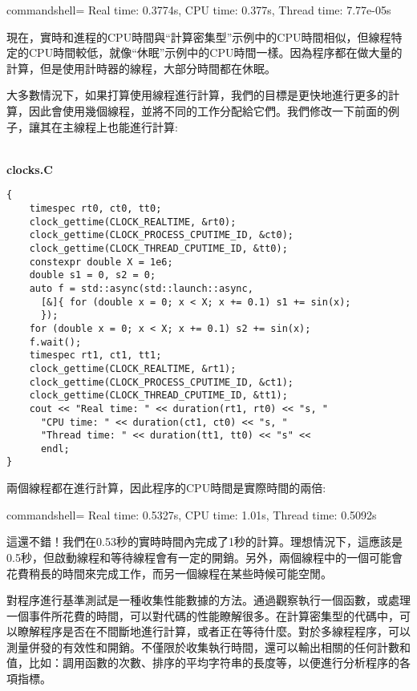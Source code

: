 \begin{tcblisting}{commandshell={}}
Real time: 0.3774s, CPU time: 0.377s, Thread time: 7.77e-05s
\end{tcblisting}

現在，實時和進程的CPU時間與“計算密集型”示例中的CPU時間相似，但線程特定的CPU時間較低，就像“休眠”示例中的CPU時間一樣。因為程序都在做大量的計算，但是使用計時器的線程，大部分時間都在休眠。

大多數情況下，如果打算使用線程進行計算，我們的目標是更快地進行更多的計算，因此會使用幾個線程，並將不同的工作分配給它們。我們修改一下前面的例子，讓其在主線程上也能進行計算:

\hspace*{\fill} \\ %
\noindent
\textbf{clocks.C}
\begin{lstlisting}[style=styleCXX]
{
	timespec rt0, ct0, tt0;
	clock_gettime(CLOCK_REALTIME, &rt0);
	clock_gettime(CLOCK_PROCESS_CPUTIME_ID, &ct0);
	clock_gettime(CLOCK_THREAD_CPUTIME_ID, &tt0);
	constexpr double X = 1e6;
	double s1 = 0, s2 = 0;
	auto f = std::async(std::launch::async,
	  [&]{ for (double x = 0; x < X; x += 0.1) s1 += sin(x);
	  });
	for (double x = 0; x < X; x += 0.1) s2 += sin(x);
	f.wait();
	timespec rt1, ct1, tt1;
	clock_gettime(CLOCK_REALTIME, &rt1);
	clock_gettime(CLOCK_PROCESS_CPUTIME_ID, &ct1);
	clock_gettime(CLOCK_THREAD_CPUTIME_ID, &tt1);
	cout << "Real time: " << duration(rt1, rt0) << "s, "
	  "CPU time: " << duration(ct1, ct0) << "s, "
	  "Thread time: " << duration(tt1, tt0) << "s" <<
	  endl;
}
\end{lstlisting}

兩個線程都在進行計算，因此程序的CPU時間是實際時間的兩倍:

\begin{tcblisting}{commandshell={}}
Real time: 0.5327s, CPU time: 1.01s, Thread time: 0.5092s
\end{tcblisting}

這還不錯！我們在0.53秒的實時時間內完成了1秒的計算。理想情況下，這應該是0.5秒，但啟動線程和等待線程會有一定的開銷。另外，兩個線程中的一個可能會花費稍長的時間來完成工作，而另一個線程在某些時候可能空閒。

對程序進行基準測試是一種收集性能數據的方法。通過觀察執行一個函數，或處理一個事件所花費的時間，可以對代碼的性能瞭解很多。在計算密集型的代碼中，可以瞭解程序是否在不間斷地進行計算，或者正在等待什麼。對於多線程程序，可以測量併發的有效性和開銷。不僅限於收集執行時間，還可以輸出相關的任何計數和值，比如：調用函數的次數、排序的平均字符串的長度等，以便進行分析程序的各項指標。

